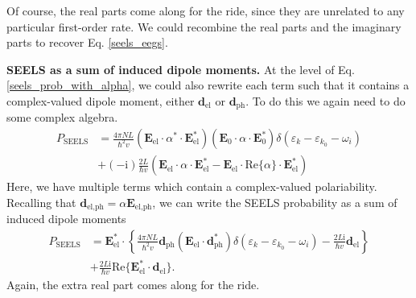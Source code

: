 \documentclass [11pt, proquest] {uwthesis}[2016/11/22]
\begin{document}
Of course, the real parts come along for the ride, since they are unrelated to any particular first-order rate. We could recombine the real parts and the imaginary parts to recover Eq. \ref{seels_eegs}. 

{\bf SEELS as a sum of induced dipole moments.} At the level of Eq. \ref{seels_prob_with_alpha}, we could also rewrite each term such that it contains a complex-valued dipole moment, either $\textbf{d}_{\textrm{el}}$ or $\textbf{d}_{\textrm{ph}}$. To do this we again need to do some complex algebra.
\begin{equation}
\begin{aligned}
P_{\textrm{SEELS}} &= \frac{4\pi NL}{\hbar^2v}(\textbf{E}_{\textrm{el}}\cdot\alpha^*\cdot\textbf{E}_{\textrm{el}}^*)(\textbf{E}_0\cdot\alpha\cdot\textbf{E}_0^*)\delta(\varepsilon_k - \varepsilon_{k_0}-\omega_i)\\
  &+ (-\textrm{i})\frac{2L}{\hbar v}(\textbf{E}_{\textrm{el}}\cdot\alpha\cdot\textbf{E}_{\textrm{el}}^*-\textbf{E}_{\textrm{el}}\cdot\textrm{Re}\{\alpha\}\cdot\textbf{E}_{\textrm{el}}^*)
  \label{real_alphas}
\end{aligned}
\end{equation}
Here, we have multiple terms which contain a complex-valued polariability. Recalling that $\textbf{d}_{\textrm{el,ph}} = \alpha\textbf{E}_{\textrm{el,ph}}$, we can write the SEELS probability as a sum of induced dipole moments
\begin{equation}
\begin{aligned}
P_{\textrm{SEELS}} &= \textbf{E}_{\textrm{el}}^*\cdot\left\{\frac{4\pi NL}{\hbar^2v}\textbf{d}_{\textrm{ph}}(\textbf{E}_{\textrm{el}}\cdot\textbf{d}_{\textrm{ph}}^*)\delta(\varepsilon_k - \varepsilon_{k_0}-\omega_i) - \frac{2L\textrm{i}}{\hbar v}\textbf{d}_{\textrm{el}}\right\}\\
  &+ \frac{2L\textrm{i}}{\hbar v}\textrm{Re}\{\textbf{E}_{\textrm{el}}^*\cdot\textbf{d}_{\textrm{el}}\}.
  \label{seels_dipoles}
\end{aligned}
\end{equation}
Again, the extra real part comes along for the ride.
\end{document}
